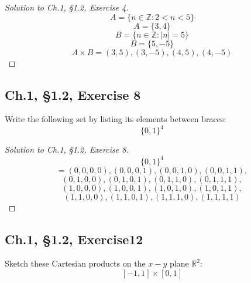 \documentclass[12pt]{amsart}
\numberwithin{equation}{section}
\theoremstyle{definition}
\theoremstyle{remark}
\begin{document}
\begin{proof}[Solution to Ch.1, \S 1.2,  Exercise 4]
$$ A = \{n \in \mathbb Z : 2 < n < 5 \} $$
$$ A = \{3, 4\} $$
$$ B = \{n \in \mathbb Z : |n| = 5 \} $$
$$ B = \{5, -5\} $$
$$ A \times B = (3, 5), (3, -5), (4, 5), (4, -5) $$

\end{proof}




\subsection*{Ch.1, \S 1.2,  Exercise 8}  Write the following set by listing its elements between braces: 
$$ \{0, 1\}^4 $$



\begin{proof}[Solution to Ch.1, \S 1.2,  Exercise 8]
$$ \{0, 1\}^4 $$
$$ =(0, 0, 0, 0), (0, 0, 0, 1), (0, 0, 1, 0), (0, 0, 1, 1), $$
$$ (0, 1, 0, 0), (0, 1, 0, 1), (0, 1, 1, 0), (0, 1, 1, 1), $$
$$ (1, 0, 0, 0), (1, 0, 0, 1), (1, 0, 1, 0), (1, 0, 1, 1), $$
$$ (1, 1, 0, 0), (1, 1, 0, 1), (1, 1, 1, 0), (1, 1, 1, 1) $$

\end{proof}




\subsection*{Ch.1, \S 1.2,  Exercise12} Sketch these Cartesian products on the $x - y$ plane $ \mathbb R^2 $:
$$ [-1, 1] \times [0, 1] $$
\end{document}
